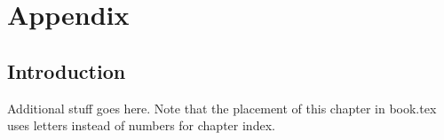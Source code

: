 
\chapter{Appendix}\label{chap:Appendix}

\section{Introduction}\label{sec:appendix-introduction}
Additional stuff goes here. Note that the placement of this chapter in book.tex uses letters instead of numbers for chapter index.
